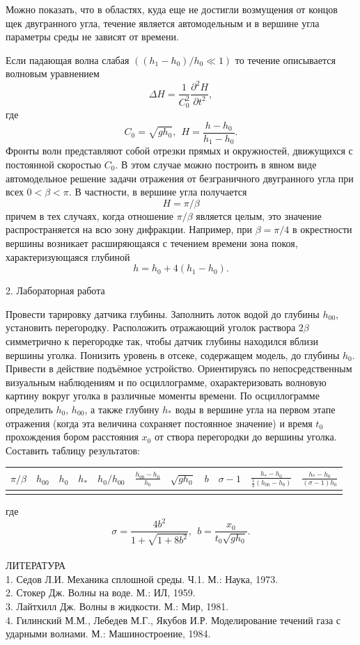 \documentclass[specialist, subf, href, colorlinks=true, 14pt, final]{disser}
\theoremstyle{definition}
\newcommand{\pdfrac}[2]{\frac{\partial #1}{\partial #2}}
\begin{document}
Можно показать, что в областях, куда еще не достигли возмущения от концов щек двугранного угла, течение является автомодельным и в вершине угла параметры среды не зависят от времени.

Если падающая волна слабая $((h_{1}-h_{0})/h_{0} \ll 1)$ то течение описывается волновым уравнением
\[
  \Delta H = \frac{1}{C_{0}^{2}} \pdfrac{^{2}H}{t^{2}},
\]
где
\[
  C_{0} = \sqrt{gh_0},\ \ H = \frac{h - h_{0}}{h_{1} - h_{0}}.
\]
Фронты волн представляют собой отрезки прямых и окружностей, движущихся с постоянной скоростью $C_0$. В этом случае можно  построить в явном виде автомодельное решение задачи отражения от безграничного двугранного угла при всех $0<\beta <\pi$. В частности, в вершине угла получается
\[
  H = \pi / \beta
\]
причем в тех случаях, когда отношение $\pi / \beta$ является целым, это значение распространяется на всю зону дифракции. Например, при $\beta = \pi /4$ в окрестности вершины возникает расширяющаяся с течением времени зона покоя, характеризующаяся глубиной
\[
  h = h_{0} + 4(h_{1} - h_{0}).
\]

2. Лабораторная работа

Провести тарировку датчика глубины. Заполнить лоток водой до глубины $h_{00}$, установить перегородку. Расположить отражающий уголок раствора $2\beta$ симметрично к перегородке так, чтобы датчик глубины находился вблизи вершины уголка. Понизить уровень в отсеке, содержащем модель, до глубины $h_0$. Привести в действие подъёмное устройство. Ориентируясь по непосредственным визуальным наблюдениям и по осциллограмме, охарактеризовать волновую картину вокруг уголка в различные моменты времени. По осциллограмме определить $h_0$, $h_{00}$, а также глубину $h_{*}$ воды в вершине угла на первом этапе отражения (когда эта величина сохраняет постоянное значение) и время $t_0$ прохождения бором расстояния $x_0$ от створа перегородки до вершины уголка. Составить таблицу результатов:
\begin{center}
  \begin{tabular}{|c|c|c|c|c|c|c|c|c|c|c|}
  \hline
  $\pi/\beta$ & $h_{00}$ & $h_{0}$ & $h_*$ & $h_{0}/h_{00}$ & {\Large $\frac{h_{00}-h_{0}}{h_0}$} & $\sqrt{gh_0}$ & $b$ & $\sigma - 1$ & {\Large $\frac{h_{*}-h_{0}}{\frac{1}{2}(h_{00}-h_{0})}$} & {\Large $\frac{h_{*}-h_{0}}{(\sigma - 1)h_{0}}$}\\
  \hline
  & & & & & & & & & &\\
  \hline
  \end{tabular}
\end{center}
где
\[
  \sigma = \frac{4b^2}{1 + \sqrt{1+8b^2}},\ \ b = \frac{x_0}{t_{0}\sqrt{gh_0}}.
\]
\\
ЛИТЕРАТУРА\\
1. Седов Л.И. Механика сплошной среды. Ч.1. М.: Наука, 1973.\\
2. Стокер Дж. Волны на воде. М.: ИЛ, 1959.\\
3. Лайтхилл Дж. Волны в жидкости. М.: Мир, 1981.\\
4. Гилинский М.М., Лебедев М.Г., Якубов И.Р. Моделирование течений газа с ударными волнами. М.: Машиностроение, 1984.
\end{document}
